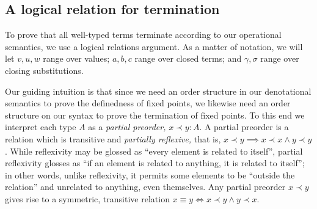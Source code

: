 
\subsection{A logical relation for termination}


\newcommand\oplr[3]{{#2} \prec {#3} : {#1}}
\newcommand\opequiv[3]{{#2} \equiv {#3} : {#1}}
\newcommand\oplrvalue[3]{\oplr{V(#1)}{#2}{#3}}
\newcommand\oplrvalueequiv[3]{\opequiv{V(#1)}{#2}{#3}}
\newcommand\oplrclosed[3]{\oplr{#1}{#2}{#3}}
\newcommand\oplrclosedequiv[3]{\opequiv{#1}{#2}{#3}}


\renewcommand\oplrvalue[3]{{#2} \prec {#3} : {#1}}
\renewcommand\oplrvalueequiv[3]{{#2} \equiv {#3} : {#1}}
\renewcommand\oplrclosed[3]{{#2} \prec {#3} : {#1}}
\renewcommand\oplrclosedequiv[3]{{#2} \equiv {#3} : {#1}}

To prove that all well-typed terms terminate according to our operational
semantics, we use a logical relations argument.
%
As a matter of notation, we will let $v,u,w$ range over values; $a,b,c$ range over closed terms; and $\gamma,\sigma$ range over closing substitutions.

Our guiding intuition is that since we need an order structure in our
denotational semantics to prove the definedness of fixed points, we likewise
need an order structure on our syntax to prove the termination of fixed points.
%
To this end we interpret each type $A$ as a \emph{partial preorder,} $\oplr A x y$.
%
A partial preorder is a relation which is transitive and \emph{partially reflexive,} that is, $x \prec y \implies x \prec  x \wedge y \prec y$. While reflexivity may be glossed as ``every element is related to itself'', partial reflexivity glosses as ``if an element is related to anything, it is related to itself''; in other words, unlike reflexivity, it permits some elements to be ``outside the relation'' and unrelated to anything, even themselves.
%
%
Any partial preorder $x \prec y$ gives rise to a symmetric, transitive relation $x \equiv y \iff x \prec y \wedge y \prec x$.\footnotemark


